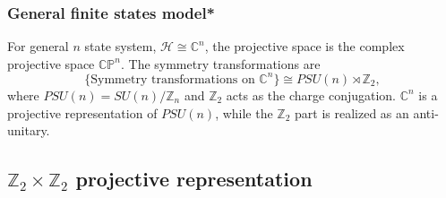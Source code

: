 \documentclass[
]{scrartcl}
\numberwithin{equation}{section}
\theoremstyle{definition}
\theoremstyle{definition}
\theoremstyle{definition}
\theoremstyle{definition}
\theoremstyle{remark}
\begin{document}
\hypertarget{general-finite-states-model}{%
\subsubsection{General finite states model*}\label{general-finite-states-model}}

For general \(n\) state system, \(\mathcal{H} \cong \mathbb{C}^n\), the projective space is the complex projective space \(\mathbb{CP}^n\). The symmetry transformations are
\begin{equation}
  \label{eq:TisPSU}
  \{\text{Symmetry transformations on $\mathbb{C}^n$}\} \cong PSU(n)\rtimes \mathbb{Z}_2,
\end{equation}
where \(PSU(n) = SU(n)/\mathbb{Z}_n\) and \(\mathbb{Z}_2\) acts as the charge conjugation.
\(\mathbb{C}^n\) is a projective representation of \(PSU(n)\), while the \(\mathbb{Z}_2\) part is realized as an anti-unitary.

\hypertarget{Z2Z2}{%
\subsection{\texorpdfstring{\(\mathbb{Z}_2\times \mathbb{Z}_2\) projective representation}{\textbackslash mathbb\{Z\}\_2\textbackslash times \textbackslash mathbb\{Z\}\_2 projective representation}}\label{Z2Z2}}
\end{document}

